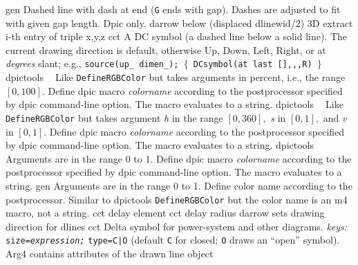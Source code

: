 %
  {gen}%
  {Dashed line with dash at end ({\tt G} ends with gap). Dashes are
   adjusted to fit with given gap length. Dpic only.}%
%
  {darrow}%
  {below (displaced dlinewid/2)}%
%
  {3D}%
  {extract i-th entry of triple x,y,z}%
%
  {cct}%
  {A DC symbol (a dashed line below a solid line).
   The current drawing direction is default, otherwise Up, Down,
   Left, Right, or at {\sl degrees} slant; e.g., 
   {\tt source(up\_ dimen\_); $\lbrace$ DCsymbol(at last [],{},{},R) $\rbrace$}
    }%
%
  {dpictools}%
  {$\;\;$ Like {\tt DefineRGBColor} but takes arguments in percent, i.e.,
    the range $[0,100].$ Define dpic macro {\sl colorname}
    according to the postprocessor specified by dpic command-line option.
    The macro evaluates to a string.}%
%
  {dpictools}%
  {$\;\;$ Like {\tt DefineRGBColor} but takes argument {\sl h} in the
    range $[0,360],$ {\sl s} in $[0,1],$ and {\sl v} in $[0,1].$
    Define dpic macro {\sl colorname}
    according to the postprocessor specified by dpic command-line option.
    The macro evaluates to a string.}%
%
  {dpictools}%
  {$\;\;$ Arguments are in the range 0 to 1. Define dpic macro {\sl colorname}
    according to the postprocessor specified by dpic command-line option.
    The macro evaluates to a string.}%
%
  {gen}%
  {Arguments are in the range 0 to 1. Define color name
    according to the postprocessor.  Similar to dpictools {\tt DefineRGBColor}
    but the color name is an m4 macro, not a string.}%
%
  {cct}%
  {delay element}%
%
  {cct}%
  {delay radius}%
%
  {darrow}%
  {sets drawing direction for dlines}%
%
  {cct}%
  {Delta symbol for power-system and other diagrams.
   {\sl keys:} {\tt size={\sl expression;}}
    {\tt type=C|O} (default {\tt C} for closed;
      {\tt O} draws an ``open'' symbol).\\
     Arg4 contains attributes of the drawn line object }%
